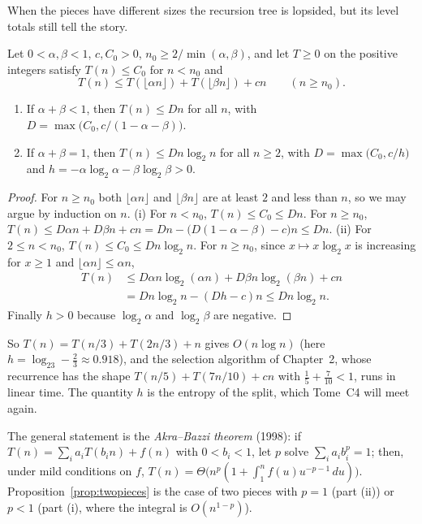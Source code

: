 When the pieces have different sizes the recursion tree is lopsided, but its level totals still tell the story.

\begin{proposition}\label{prop:twopieces}
Let $0<\alpha,\beta<1$, $c,C_0>0$, $n_0\ge2/\min(\alpha,\beta)$, and let $T\ge0$ on the positive integers satisfy $T(n)\le C_0$ for $n<n_0$ and
\[
T(n)\le T(\lfloor\alpha n\rfloor)+T(\lfloor\beta n\rfloor)+cn\qquad(n\ge n_0).
\]
\begin{enumerate}
\item[(i)] If $\alpha+\beta<1$, then $T(n)\le Dn$ for all $n$, with $D=\max\bigl(C_0,c/(1-\alpha-\beta)\bigr)$.
\item[(ii)] If $\alpha+\beta=1$, then $T(n)\le Dn\log_2n$ for all $n\ge2$, with $D=\max\bigl(C_0,c/h\bigr)$ and $h=-\alpha\log_2\alpha-\beta\log_2\beta>0$.
\end{enumerate}
\end{proposition}
\begin{proof}
For $n\ge n_0$ both $\lfloor\alpha n\rfloor$ and $\lfloor\beta n\rfloor$ are at least $2$ and less than $n$, so we may argue by induction on $n$.
(i) For $n<n_0$, $T(n)\le C_0\le Dn$. For $n\ge n_0$, $T(n)\le D\alpha n+D\beta n+cn=Dn-\bigl(D(1-\alpha-\beta)-c\bigr)n\le Dn$.
(ii) For $2\le n<n_0$, $T(n)\le C_0\le Dn\log_2n$. For $n\ge n_0$, since $x\mapsto x\log_2x$ is increasing for $x\ge1$ and $\lfloor\alpha n\rfloor\le\alpha n$,
\[
\begin{aligned}
T(n)&\le D\alpha n\log_2(\alpha n)+D\beta n\log_2(\beta n)+cn\\
&=Dn\log_2n-(Dh-c)n\le Dn\log_2n.
\end{aligned}
\]
Finally $h>0$ because $\log_2\alpha$ and $\log_2\beta$ are negative.
\end{proof}

So $T(n)=T(n/3)+T(2n/3)+n$ gives $O(n\log n)$ (here $h=\log_23-\frac23\approx0.918$), and the selection algorithm of Chapter~2, whose recurrence has the
shape $T(n/5)+T(7n/10)+cn$ with $\frac15+\frac7{10}<1$, runs in linear time. The quantity $h$ is the entropy of the split, which Tome~C4 will meet again.

\begin{remark}
The general statement is the \emph{Akra--Bazzi theorem} (1998): if
$T(n)=\sum_ia_iT(b_in)+f(n)$ with $0<b_i<1$, let $p$ solve $\sum_ia_ib_i^p=1$; then, under mild conditions on $f$,
$T(n)=\Theta\bigl(n^p(1+\int_1^nf(u)u^{-p-1}\,du)\bigr)$. Proposition~\ref{prop:twopieces} is the case of two pieces with $p=1$ (part (ii)) or
$p<1$ (part (i), where the integral is $O(n^{1-p})$).
\end{remark}


